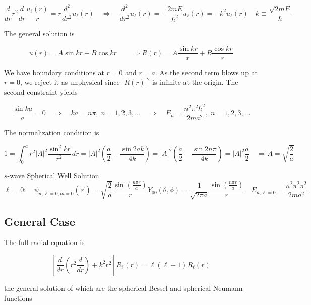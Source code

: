\[
\frac{d }{d r} r^2 \frac{d }{d r} \frac{u_\ell (r)}{r} = r \frac{d^2 }{d r^2}
u_\ell (r) \quad \Rightarrow \quad \frac{d^2 }{d r^2} u_\ell (r)
= -\frac{2mE}{\hbar^2}u_\ell (r) = -k^2 u_\ell (r) \quad k \equiv
\frac{\sqrt{2mE}}{\hbar}
\] \vspace{3px}

The general solution is 

\[
u(r) = A\sin kr + B\cos kr \qquad \Rightarrow R(r) = A \frac{\sin kr}{r}
+ B\frac{\cos kr}{r}
\] \vspace{3px}



We have boundary conditions at $r = 0$  and $r = a$. As the second term blows
up at $r=0$, we reject it as unphysical since $|R(r)|^2$ is infinite at the
origin.  The second constraint yields 

\[
\frac{\sin ka}{a} = 0 \quad \Rightarrow \quad ka = n\pi, \; n = 1,2,3,\hdots
\quad \Rightarrow \quad E_n = \frac{n^2\pi^2\hbar^2}{2ma^2}, \;
n = 1,2,3,\hdots
\] \vspace{3px}

The normalization condition is 

\[
1 = \int_{0}^{a} r^2|A|^2 \frac{\sin^2kr}{r^2} \, dr = |A|^2 \left( \frac{a}{2}
  - \frac{\sin 2ak}{4k}\right) = |A|^2 \left( \frac{a}{2} - \frac{\sin
2n\pi}{4k} \right) = |A|^2 \frac{a}{2} \quad \Rightarrow A = \sqrt{\frac{2}{a}}  
\] \vspace{3px}

\begin{mainbox}{$s$-wave Spherical Well Solution}
  \[ \ell =0: \quad \psi_{n, \ell = 0, m = 0}(\vec{r})
    = \sqrt{\frac{2}{a}}\frac{\sin\left( \frac{n\pi r}{a} \right)}{r} Y_{00}
    (\theta, \phi) = \frac{1}{\sqrt{2\pi a}} \frac{\sin \left( \frac{n\pi r}{a}
  \right)  }{r} \quad E_{n, \ell =0} = \frac{n^2\pi^2 \pi^2}{2ma^2} \]
\end{mainbox}

\subsection{General Case}

The full radial equation is 

\[
  \left[ \frac{d }{d r} \left( r^2 \frac{d }{d r}  \right) + k^2r^2 \right]
  R_\ell (r) = \ell (\ell +1) R_\ell (r) 
\] \vspace{3px}

the general solution of which are the spherical Bessel and spherical Neumann
functions

